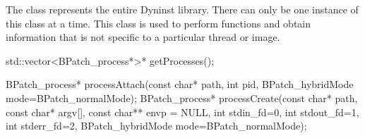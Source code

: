 
The  class represents the entire Dyninst library. There can only be one instance
of this class at a time. This class is used to perform functions and obtain information that
is not specific to a particular thread or image.

\begin{apient}
std::vector<BPatch_process*>* getProcesses();
\end{apient}


\begin{apient}
BPatch_process* processAttach(const char* path, int pid, BPatch_hybridMode mode=BPatch_normalMode);
BPatch_process* processCreate(const char* path, const char* argv[], const char** envp = NULL,
                              int stdin_fd=0, int stdout_fd=1, int stderr_fd=2,
                              BPatch_hybridMode mode=BPatch_normalMode);
\end{apient}

